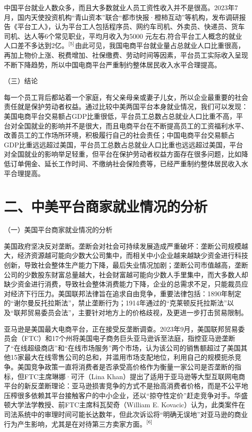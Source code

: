 \documentclass[12pt,twoside,utf8]{ctexart}
\begin{document}
中国平台就业人数众多，而且大多数就业人员工资性收入并不是很高。2023年7月，国内天使投资机构“青山资本”联合“都市快报·橙柿互动”等机构，发布调研报告《平台工人》，认为平台工人包括程序员、网约车司机、外卖员、快递员、货车司机、达人等6个常见职业，平均月收入为5000 元左右,符合平台工人概念的就业人口差不多达到2亿。$\textsuperscript{[5]}$由此可见，我国电商平台就业量占总就业人口比重很高，再加上物价上涨、税费增加、社保缴费、劳动时间等因素，平台员工实际收入呈现不断下降趋势，所以中国电商平台严重制约整体居民收入水平合理提高。

（三）结论

每一个员工背后都站着一个家庭，有父亲母亲或妻子儿女，所以企业最重要的社会责任就是保护劳动者权益。通过比较中美两国平台本身就业情况，我们可以发现：美国电商平台交易额占GDP比重很低，平台员工总数占总就业人口比重不高，平台对全国就业的影响并不是很大，而且电商平台在不断提高员工的工资福利水平、改善员工的工作场所环境，积极履行自己的社会责任；中国电商平台交易额占GDP比重远远超过美国，平台员工总数占总就业人口比重也远远超过美国，平台对全国就业的影响举足轻重，但平台在保护劳动者权益方面存在很多问题，比如降低订单佣金、延长工作时间、不缴纳社会保险费等，已经严重制约整体居民收入水平合理提高。

{\centering\section *{二、中美平台商家就业情况的分析}}

（一）美国平台商家就业情况的分析

美国政府坚决反对垄断。垄断会对社会可持续发展造成严重破坏：垄断公司规模越大，经济资源越可能向少数大公司集中，而相关中小企业越来越缺少资金进行科技创新，导致社会整体生产能力下降，最后失业情况加剧；垄断公司市值越高，垄断公司的少数股东财富总量越大，社会财富越可能向少数人手里集中，而大多数人却缺少资金进行消费，导致社会整体消费能力下降，企业的总需求不足，只能裁员应对经济下行压力。美国联邦法律旨在追求自由竞争，重要法律包括：1890年制定的“谢尔曼反托拉斯法”，禁止垄断行为；1914年通过的“克莱顿反托拉斯法”以及“联邦贸易委员会法”，主要针对地方上的价格歧视，及更进一步打击贸易限制。

亚马逊是美国最大电商平台，正在接受反垄断调查。2023年9月，美国联邦贸易委员会（FTC）和17个州将美国电子商务巨头亚马逊诉至法庭，指控亚马逊垄断了“在线超级商店”和“在线市场服务”两个市场，认为该公司的销售额超过了美国其他15家最大在线零售公司的总和，并滥用市场支配地位，利用自己的规模扼杀竞争。美国竞争政策一直将消费者是否承受高价格作为衡量一家公司是否垄断的指标，但FTC主席琳娜·可汗（Lina Khan）提出了适用于亚马逊等大型互联网电商平台的新反垄断理论：亚马逊损害竞争的方式不是抬高消费者价格，而是不公平地压榨很多依赖其平台接触客户的中小企业，还以“掠夺性定价”赶走竞争对手。华盛顿大学法学教授、前FTC主席科瓦契奇（William E. Kovacic）认为，此类案件在司法系统中的审理时间可能长达数年，但此次诉讼将“明确无误地”对亚马逊的商业行为产生影响，尤其是在对待第三方卖家方面。$\textsuperscript{[6]}$
\end{document}
